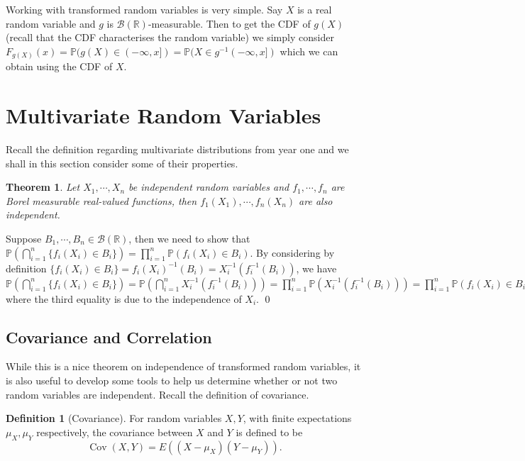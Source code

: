 \documentclass[
]{article}
\newtheorem{theorem}{Theorem}
\theoremstyle{definition}
\newtheorem{definition}{Definition}[section]
\begin{document}
Working with transformed random variables is very simple. Say \(X\) is a
real random variable and \(g\) is
\(\mathcal{B}(\mathbb{R})\)-measurable. Then to get the CDF of \(g(X)\)
(recall that the CDF characterises the random variable) we simply
consider
\(F_{g(X)}(x) = \mathbb{P}(g(X) \in (-\infty, x]) = \mathbb{P}(X \in g^{-1}(-\infty, x])\)
which we can obtain using the CDF of \(X\).

\hypertarget{multivariate-random-variables}{%
\section{Multivariate Random
Variables}\label{multivariate-random-variables}}

Recall the definition regarding multivariate distributions from year one
and we shall in this section consider some of their properties.

\begin{theorem}
  Let \(X_1, \cdots, X_n\) be independent random variables and \(f_1, \cdots, f_n\) 
  are Borel measurable real-valued functions, then \(f_1(X_1), \cdots, f_n(X_n)\) 
  are also independent.  
\end{theorem}
\proof

Suppose \(B_1, \cdots, B_n \in \mathcal{B}(\mathbb{R})\), then we need
to show that
\(\mathbb{P}(\bigcap_{i = 1}^n\{f_i(X_i) \in B_i\})  = \prod_{i = 1}^n \mathbb{P}(f_i(X_i) \in B_i)\).
By considering by definition
\(\{f_i(X_i) \in B_i\} = f_i(X_i)^{-1}(B_i) = X_i^{-1}(f_i^{-1}(B_i))\),
we have
\(\mathbb{P}(\bigcap_{i = 1}^n\{f_i(X_i) \in B_i\}) =  \mathbb{P}(\bigcap_{i = 1}^n X_i^{-1}(f_i^{-1}(B_i))) =  \prod_{i = 1}^n \mathbb{P}(X_i^{-1}(f_i^{-1}(B_i))) =  \prod_{i = 1}^n \mathbb{P}(f_i(X_i) \in B_i)\)
where the third equality is due to the independence of \(X_i\). \qed

\hypertarget{covariance-and-correlation}{%
\subsection{Covariance and
Correlation}\label{covariance-and-correlation}}

While this is a nice theorem on independence of transformed random
variables, it is also useful to develop some tools to help us determine
whether or not two random variables are independent. Recall the
definition of covariance.

\begin{definition}[Covariance]
  For random variables \(X, Y\), with finite expectations \(\mu_X, \mu_Y\) 
  respectively, the covariance between \(X\) and \(Y\) is defined to be 
  \[\mathop{\mathrm{Cov}}(X, Y) = E((X - \mu_X) (Y - \mu_Y)).\]
\end{definition}
\end{document}
